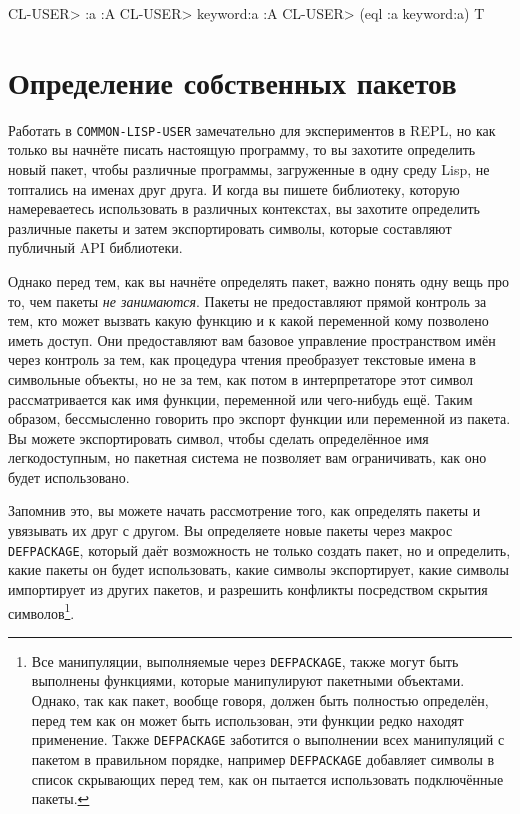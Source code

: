 \begin{myverb}
CL-USER> :a
:A
CL-USER> keyword:a
:A
CL-USER> (eql :a keyword:a)
T
\end{myverb}

\section{Определение собственных пакетов}

Работать в \lstinline{COMMON-LISP-USER} замечательно для экспериментов в REPL, но как только вы
начнёте писать настоящую программу, то вы захотите определить новый пакет, чтобы различные
программы, загруженные в одну среду Lisp, не топтались на именах друг друга. И когда вы
пишете библиотеку, которую намереваетесь использовать в различных контекстах, вы захотите
определить различные пакеты и затем экспортировать символы, которые составляют публичный
API библиотеки.

Однако перед тем, как вы начнёте определять пакет, важно понять одну вещь про то, чем
пакеты \textit{не занимаются}. Пакеты не предоставляют прямой контроль за тем, кто может
вызвать какую функцию и к какой переменной кому позволено иметь доступ. Они предоставляют
вам базовое управление пространством имён через контроль за тем, как процедура чтения
преобразует текстовые имена в символьные объекты, но не за тем, как потом в интерпретаторе
этот символ рассматривается как имя функции, переменной или чего-нибудь ещё. Таким
образом, бессмысленно говорить про экспорт функции или переменной из пакета. Вы можете
экспортировать символ, чтобы сделать определённое имя легкодоступным, но пакетная система
не позволяет вам ограничивать, как оно будет использовано.

Запомнив это, вы можете начать рассмотрение того, как определять пакеты и увязывать их
друг с другом.  Вы определяете новые пакеты через макрос \lstinline{DEFPACKAGE}, который даёт
возможность не только создать пакет, но и определить, какие пакеты он будет использовать,
какие символы экспортирует, какие символы импортирует из других пакетов, и разрешить
конфликты посредством скрытия символов\footnote{Все манипуляции, выполняемые через
    \lstinline{DEFPACKAGE}, также могут быть выполнены функциями, которые манипулируют
    пакетными объектами. Однако, так как пакет, вообще говоря, должен быть полностью
    определён, перед тем как он может быть использован, эти функции редко находят
    применение. Также \lstinline{DEFPACKAGE} заботится о выполнении всех манипуляций с пакетом
    в правильном порядке, например \lstinline{DEFPACKAGE} добавляет символы в список
    скрывающих перед тем, как он пытается использовать подключённые пакеты.}\hspace{\footnotenegspace}.

